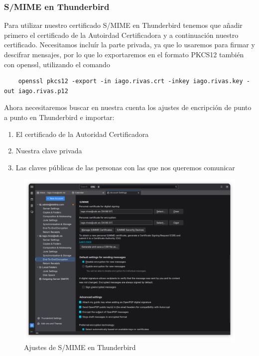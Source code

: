 \subsubsection{S/MIME en Thunderbird}

Para utilizar nuestro certificado S/MIME en Thunderbird tenemos que añadir primero el certificado de la Autoirdad Certificadora y a continuación nuestro certificado. Necesitamos incluír la parte privada, ya que lo usaremos para firmar y descifrar mensajes, por lo que lo exportaremos en el formato PKCS12 también con openssl, utilizando el comando

\begin{verbatim}
    openssl pkcs12 -export -in iago.rivas.crt -inkey iago.rivas.key -out iago.rivas.p12
\end{verbatim}

Ahora necesitaremos buscar en nuestra cuenta los ajustes de encripción de punto a punto en Thunderbird e importar:
\begin{enumerate}
    \item El certificado de la Autoridad Certificadora
    \item Nuestra clave privada
    \item Las claves públicas de las personas con las que nos queremos comunicar
\end{enumerate}

\begin{figure}[H]
    \centering
    \includegraphics[width=\textwidth]{thunderbird-smime-configuracion.png}
    \caption{Ajustes de S/MIME en Thunderbird}
\end{figure}

